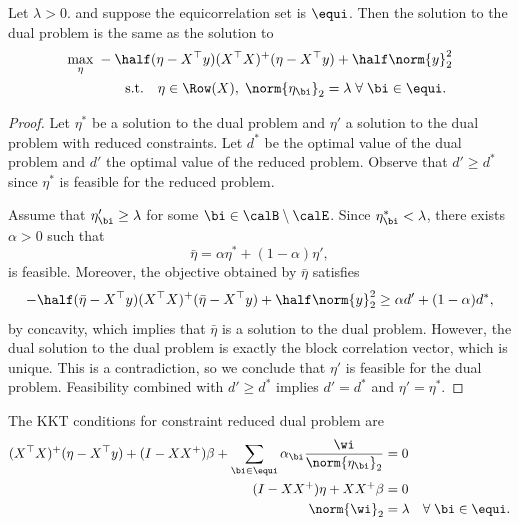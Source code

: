 \begin{lemma}
	Let \( \lambda > 0 \).
	and suppose the equicorrelation set is \( \equi \).
	Then the solution to the  dual problem
	is the same as the solution to
	\begin{equation}\label{eq:reduced-dual}
		\begin{aligned}
			\max_{\eta} \;
			 & - \half (\eta - X^\top y) (X^\top X)^+ (\eta - X^\top y) + \half \norm{y}_2^2                               \\
			 & \quad \quad \text{s.t.} \quad \eta \in \Row(X), \; \norm{\eta_\bi}_2 = \lambda \; \forall \; \bi \in \equi.
		\end{aligned}
	\end{equation}
\end{lemma}
\begin{proof}
	Let \( \eta^* \) be a solution to the dual problem
	and \( \eta' \) a solution to the dual problem with reduced constraints.
	Let \( d^* \) be the optimal value of the dual problem and \( d' \) the
	optimal value of the reduced problem.
	Observe that \( d' \geq d^* \) since \( \eta^* \) is feasible for the
	reduced problem.

	Assume that \( \eta'_\bi \geq \lambda \) for some \( \bi \in \calB \setminus \calE \).
	Since \( \eta^*_\bi < \lambda \), there exists \( \alpha > 0 \)
	such that
	\[
		\bar \eta = \alpha \eta^* + (1- \alpha) \eta',
	\]
	is feasible.
	Moreover, the objective obtained by \( \bar \eta \) satisfies
	\[
		- \half (\bar \eta - X^\top y) (X^\top X)^+ (\bar \eta - X^\top y) + \half \norm{y}_2^2                              \geq \alpha d' + (1 - \alpha) d^*,
	\]
	by concavity, which implies that \( \bar \eta \) is a solution to the dual problem.
	However, the dual solution to the dual problem is exactly the block correlation
	vector, which is unique.
	This is a contradiction, so we conclude that \( \eta' \) is feasible
	for the dual problem.
	Feasibility combined with \( d' \geq d^* \) implies \( d' = d^* \)
	and \( \eta' = \eta^* \).
\end{proof}

The KKT conditions for constraint reduced dual problem are
\begin{equation}\label{eq:dual-kkt-conditions}
	\begin{aligned}
		(X^\top X)^+ (\eta - X^\top y)
		+ (I - X X^+) \beta
		+ \sum_{\bi \in \equi} \alpha_\bi \frac{\wi}{\norm{\eta_\bi}_2}
		                               & = 0                                       \\
		(I - X X^+) \eta + X X^+ \beta & = 0                                       \\
		\norm{\wi}_2                   & = \lambda \quad \forall \; \bi \in \equi.
	\end{aligned}
\end{equation}

